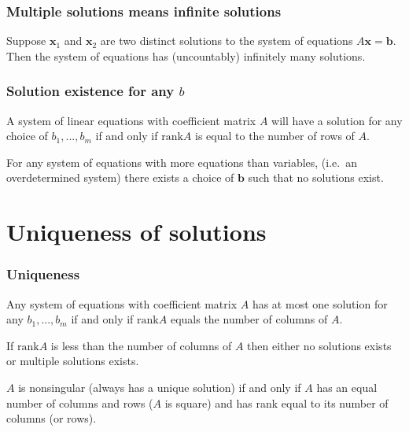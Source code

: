 \documentclass[compress]{beamer}
\newcommand{\rank}{\mathrm{rank}}
\begin{document}
\begin{frame}\frametitle{Multiple solutions means infinite solutions}
  \begin{lemma}\label{lem:sinf}
    Suppose $\mathbf{x}_1$ and $\mathbf{x}_2$ are two distinct
    solutions to the system of equations $A \mathbf{x} =
    \mathbf{b}$. Then the system of equations has (uncountably)
    infinitely many solutions.
  \end{lemma}
\end{frame}

\begin{frame}\frametitle{Solution existence for any $b$}
  \begin{theorem}\label{thm:sexist}
    A system of linear equations with coefficient matrix $A$ will have a
    solution for any choice of $b_1, ..., b_m$ if and only if $\rank A$
    is equal to the number of rows of $A$.
  \end{theorem}

  \begin{corollary}
    For any system of equations with more equations than variables,
    (i.e.\ an overdetermined system)
    there exists a choice of $\textbf{b}$ such that no solutions exist. 
  \end{corollary}
\end{frame}

\section{Uniqueness of solutions}

\begin{frame}\frametitle{Uniqueness}
  \begin{theorem} \label{thm:sunique}
    Any system of equations with coefficient matrix $A$ has at most one
    solution for any $b_1, ... , b_m$ if and only if $\rank A$ equals
    the number of columns of $A$. 
  \end{theorem}

  \begin{corollary}\label{cor:smult}
    If $\rank A$ is less than the number of columns of $A$ then either
    no solutions exists or multiple solutions exists.
  \end{corollary}
  
  \begin{corollary}
    $A$ is nonsingular (always has a unique solution) if and only if
    $A$ has an equal number of columns and rows ($A$ is square) and
    has rank equal to its number of columns (or rows).
  \end{corollary}
\end{frame}
\end{document}
